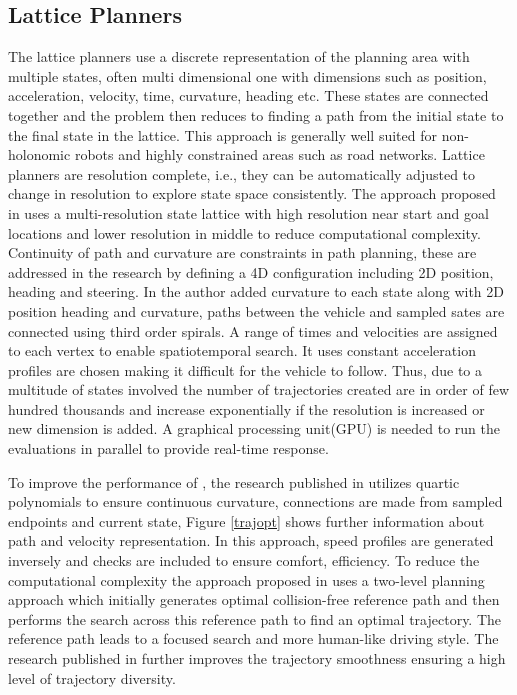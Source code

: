 \subsection{Lattice Planners}
\label{rw_lattice_planners}
The lattice planners use a discrete representation of the planning area with multiple states, often multi dimensional one with dimensions such as position, acceleration, velocity, time, curvature, heading etc. These states are connected together and the problem then reduces to finding a path from the initial state to the final state in the lattice. This approach is generally well suited for non-holonomic robots and highly constrained areas such as road networks\cite{lattice_1}. Lattice planners are resolution complete, i.e., they can be automatically adjusted to change in resolution to explore state space consistently. The approach proposed in \cite{lattice_1} uses a multi-resolution state lattice with high resolution near start and goal locations and lower resolution in middle to reduce computational complexity. Continuity of path and curvature are constraints in path planning, these are addressed in the research \cite{lattice_2} by defining a 4D configuration including 2D position, heading and steering. In \cite{cmu_parallel_thesis} the author added curvature to each state along with 2D position heading and curvature, paths between the vehicle and sampled sates are connected using third order spirals. A range of times and velocities are assigned to each vertex to enable spatiotemporal search. It uses constant acceleration profiles are chosen making it difficult for the vehicle to follow. Thus, due to a multitude of states involved the number of trajectories created are in order of few hundred thousands and increase exponentially if the resolution is increased or new dimension is added. A graphical processing unit(GPU) is needed to run the evaluations in parallel to provide real-time response. 

To improve the performance of \cite{cmu_parallel_thesis}, the research published in \cite{traj_planner_optimization} utilizes quartic polynomials to ensure continuous curvature, connections are made from sampled endpoints and current state, Figure \ref{trajopt} shows further information about path and velocity representation. In this approach, speed profiles are generated inversely and checks are included to ensure comfort, efficiency. To reduce the computational complexity the approach proposed in \cite{traj_smoothing} uses a two-level planning approach which initially generates optimal collision-free reference path and then performs the search across this reference path to find an optimal trajectory. The reference path leads to a focused search and more human-like driving style. The research published in \cite{diss_shui_phd_thesis} further improves the trajectory smoothness ensuring a high level of trajectory diversity.

